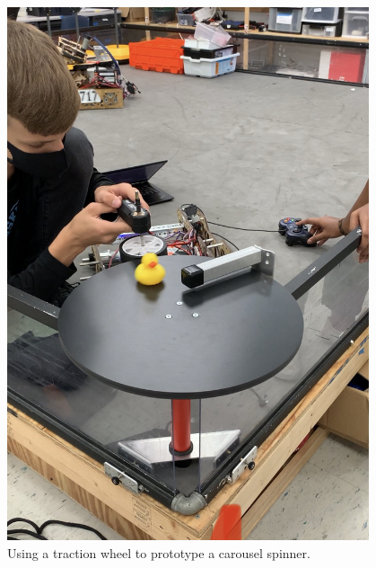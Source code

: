 \begin{figure}[ht]
\centering
\begin{minipage}[b]{.48\textwidth}
  \centering
  \includegraphics[width=0.95\textwidth]{Meetings/September/09-28-21/9-28-21_Hardware_Image1 - Nathan Forrer.jpg}
  \caption{Using a traction wheel to prototype a carousel spinner.}
  \label{fig:pic1}
\end{minipage}%
\hfill%
\begin{minipage}[b]{.48\textwidth}
  \centering

\end{minipage}
\end{figure}
